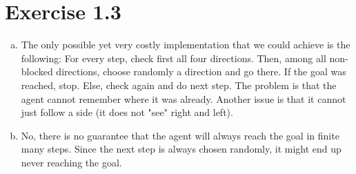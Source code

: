 \documentclass{article} %
\begin{document}
\section*{Exercise 1.3}

\begin{enumerate}[(a)]
    \item The only possible yet very costly implementation that we could achieve is
    the following:
    For every step, check first all four directions. Then, among all non-blocked
    directions, choose randomly a direction and go there. If the goal was reached, stop.
    Else, check again and do next step.
    The problem is that the agent cannot remember where it was already. Another issue
    is that it cannot just follow a side (it does not "see" right and left).
    \item No, there is no guarantee that the agent will always reach the goal in
    finite many steps. Since the next step is always chosen randomly, it might end up never
    reaching the goal.
\end{enumerate}
\end{document}
